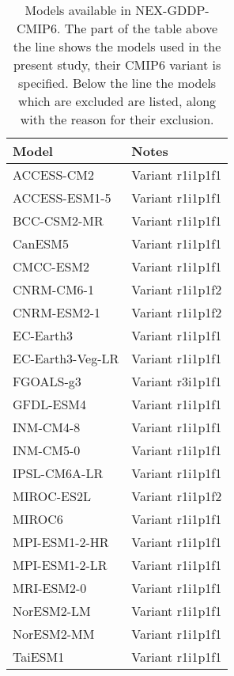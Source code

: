 \begin{table}[h]
  \centering
  \caption{Models available in NEX-GDDP-CMIP6. The part of the table above the line shows the models used in the present study, their \gls{CMIP6} variant is specified. Below the line the models which are excluded are listed, along with the reason for their exclusion.}
  \label{tab:CMIP6_models}
  \begin{tabular}{ll}
    Model            & Notes                          \\
    \hline
    ACCESS-CM2       & Variant r1i1p1f1               \\
    ACCESS-ESM1-5    & Variant r1i1p1f1               \\
    BCC-CSM2-MR      & Variant r1i1p1f1               \\
    CanESM5          & Variant r1i1p1f1               \\
    CMCC-ESM2        & Variant r1i1p1f1               \\
    CNRM-CM6-1       & Variant r1i1p1f2               \\
    CNRM-ESM2-1      & Variant r1i1p1f2               \\
    EC-Earth3        & Variant r1i1p1f1               \\
    EC-Earth3-Veg-LR & Variant r1i1p1f1               \\
    FGOALS-g3        & Variant r3i1p1f1               \\
    GFDL-ESM4        & Variant r1i1p1f1               \\
    INM-CM4-8        & Variant r1i1p1f1               \\
    INM-CM5-0        & Variant r1i1p1f1               \\
    IPSL-CM6A-LR     & Variant r1i1p1f1               \\
    MIROC-ES2L       & Variant r1i1p1f2               \\
    MIROC6           & Variant r1i1p1f1               \\
    MPI-ESM1-2-HR    & Variant r1i1p1f1               \\
    MPI-ESM1-2-LR    & Variant r1i1p1f1               \\
    MRI-ESM2-0       & Variant r1i1p1f1               \\
    NorESM2-LM       & Variant r1i1p1f1               \\
    NorESM2-MM       & Variant r1i1p1f1               \\
    TaiESM1          & Variant r1i1p1f1               \\

\end{tabular}
\end{table}
